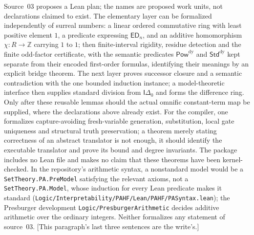 \documentclass[11pt]{article}
\theoremstyle{definition}
\theoremstyle{remark}
\newcommand{\Z}{\mathbb{Z}}
\newcommand{\PowDy}{\mathsf{Pow}^{\mathrm{dy}}}
\newcommand{\StdDy}{\mathsf{Std}^{\mathrm{dy}}}
\newcommand{\ED}{\mathsf{ED}}
\newcommand{\Idelta}{\mathsf{I}\Delta_0}
\newcommand{\fn}[1]{\nolinkurl{#1}}
\begin{document}
Source~03 proposes a Lean plan; the names are proposed work units, not
declarations claimed to exist. The elementary layer can be formalized
independently of surreal numbers: a linear ordered commutative ring with
least positive element $1$, a predicate expressing $\ED_n$, and an
additive homomorphism $\chi:R\to\Z$ carrying $1$ to $1$; then
finite-interval rigidity, residue detection and the finite odd-factor
certificate, with the semantic predicates $\PowDy$ and $\StdDy$ kept
separate from their encoded first-order formulas, identifying their
meanings by an explicit bridge theorem. The next layer proves successor
closure and a semantic contradiction with the one bounded induction
instance; a model-theoretic interface then supplies standard division from
$\Idelta$ and forms the difference ring. Only after these reusable lemmas
should the actual omnific constant-term map be supplied, where the
declarations above already exist. For the compiler, one formalizes
capture-avoiding fresh-variable generation, substitution, local gate
uniqueness and structural truth preservation; a theorem merely stating
correctness of an abstract translator is not enough, it should identify the
executable translator and prove its bound and degree invariants. The
package includes no Lean file and makes no claim that these theorems have
been kernel-checked. In the repository's arithmetic syntax, a nonstandard
model would be a \fn{SetTheory.PA.PreModel} satisfying the relevant axioms,
not a \fn{SetTheory.PA.Model}, whose induction for every Lean predicate
makes it standard
(\fn{Logic/Interpretability/PAHF/Lean/PAHF/PASyntax.lean}); the Presburger
development \fn{Logic/PresburgerArithmetic} decides additive arithmetic
over the ordinary integers. Neither formalizes any statement of source~03.
\textup{[}This paragraph's last three sentences are the write's.\textup{]}
\end{document}

